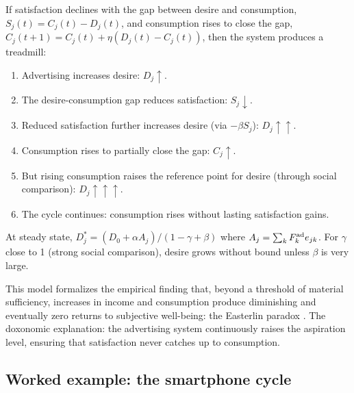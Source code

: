 \begin{proposition}
\label{prop:treadmill}
If satisfaction declines with the gap between desire and consumption, $S_j(t) = C_j(t) - D_j(t)$, and consumption rises to close the gap, $C_j(t+1) = C_j(t) + \eta(D_j(t) - C_j(t))$, then the system produces a treadmill:
\begin{enumerate}[nosep]
  \item Advertising increases desire: $D_j \uparrow$.
  \item The desire-consumption gap reduces satisfaction: $S_j \downarrow$.
  \item Reduced satisfaction further increases desire (via $-\beta S_j$): $D_j \uparrow\uparrow$.
  \item Consumption rises to partially close the gap: $C_j \uparrow$.
  \item But rising consumption raises the reference point for desire (through social comparison): $D_j \uparrow\uparrow\uparrow$.
  \item The cycle continues: consumption rises without lasting satisfaction gains.
\end{enumerate}
At steady state, $D_j^* = (D_0 + \alpha A_j) / (1 - \gamma + \beta)$ where $A_j = \sum_k F_{k}^{\text{ad}} e_{jk}$.
For $\gamma$ close to 1 (strong social comparison), desire grows without bound unless $\beta$ is very large.
\end{proposition}

This model formalizes the empirical finding that, beyond a threshold of material sufficiency, increases in income and consumption produce diminishing and eventually zero returns to subjective well-being: the Easterlin paradox \autocite{easterlin1974}.
The doxonomic explanation: the advertising system continuously raises the aspiration level, ensuring that satisfaction never catches up to consumption.

\subsection{Worked example: the smartphone cycle}

